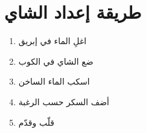 ﻿\documentclass{article}
\begin{document}
\section{طريقة إعداد الشاي}
\begin{enumerate}
\item اغلِ الماء في إبريق
\item ضع الشاي في الكوب
\item اسكب الماء الساخن
\item أضف السكر حسب الرغبة
\item قلّب وقدّم
\end{enumerate}
\end{document}
